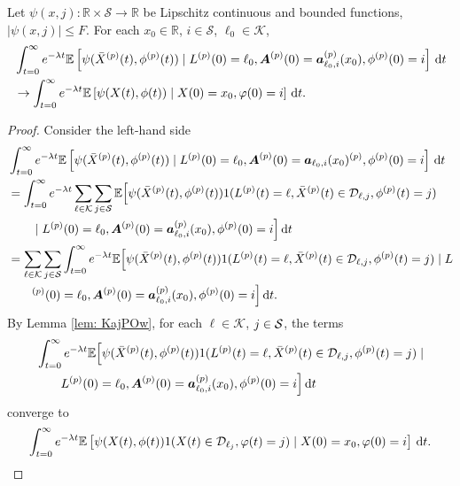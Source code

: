 \begin{cor}\label{cor: lk}
	Let \(\psi(x,j):\mathbb R\times \mathcal S \to \mathbb R\) be Lipschitz continuous and bounded functions, \(|\psi(x,j)|\leq F\). For each \(x_0\in\mathbb R\), \(i\in\mathcal S\), \(\ell_0\in\mathcal K\), 
	\begin{align}
		&\int_{t=0}^\infty e^{-\lambda t}\mathbb E\left[\psi(\bar X^{(p)}(t),\phi^{(p)}(t))  \mid L^{(p)}(0)=\ell_0, \boldsymbol A^{(p)}(0)=\boldsymbol  a_{\ell_0,i}^{(p)}(x_0), \phi^{(p)}(0)=i \right] \, \mathrm{d} t \nonumber
		\\&\to \int_{t=0}^\infty e^{-\lambda t}  \mathbb E\left[\psi(X(t),\phi(t))\mid X(0)=x_0, \varphi(0)=i \right] \, \mathrm{d} t.\nonumber
	\end{align}
\end{cor}
\begin{proof}
	Consider the left-hand side 
	\begin{align}
		&\int_{t=0}^\infty e^{-\lambda t}\mathbb E\left[\psi(\bar X^{(p)}(t),\phi^{(p)}(t))  \mid L^{(p)}(0)=\ell_0, \boldsymbol A^{(p)}(0)=\boldsymbol  a_{\ell_0,i}(x_0)^{(p)}, \phi^{(p)}(0)=i \right] \, \mathrm{d} t \nonumber 
		\\&= \int_{t=0}^\infty e^{-\lambda t}\sum_{\ell\in\mathcal K}\sum_{j\in\mathcal S}\mathbb E\Big[\psi(\bar X^{(p)}(t),\phi^{(p)}(t)) 1(L^{(p)}(t)=\ell, \bar X^{(p)}(t) \in \mathcal D_{\ell,j},\phi^{(p)}(t)=j) \nonumber 
		\\&\qquad{} \mid L^{(p)}(0)=\ell_0,  \boldsymbol A^{(p)}(0)=\boldsymbol  a_{\ell_0,i}^{(p)}(x_0), \phi^{(p)}(0)=i \Big] \, \mathrm{d} t \nonumber 
		\\&= \sum_{\ell\in\mathcal K}\sum_{j\in\mathcal S}\int_{t=0}^\infty e^{-\lambda t}\mathbb E\Big[\psi(\bar X^{(p)}(t),\phi^{(p)}(t)) 1(L^{(p)}(t)=\ell, \bar X^{(p)}(t) \in \mathcal D_{\ell,j},\phi^{(p)}(t)=j)  \mid L\nonumber 
		\\&\qquad{} ^{(p)}(0)=\ell_0, \boldsymbol A^{(p)}(0)=\boldsymbol  a_{\ell_0,i}^{(p)}(x_0), \phi^{(p)}(0)=i \Big] \, \mathrm{d} t. \label{eqnL AKJF cjk ajhJK}
	\end{align}
	By Lemma \ref{lem: KajPOw}, for each \(\ell\in\mathcal K\), \(j\in\mathcal{S}\), the terms 
	 \begin{align}
	 	&\int_{t=0}^\infty e^{-\lambda t}\mathbb E\Big[\psi(\bar X^{(p)}(t),\phi^{(p)}(t)) 1(L^{(p)}(t)=\ell, \bar X^{(p)}(t) \in \mathcal D_{\ell,j},\phi^{(p)}(t)=j)  \mid \nonumber 
		\\&\qquad{}L^{(p)}(0)=\ell_0,  \boldsymbol A^{(p)}(0)=\boldsymbol  a_{\ell_0,i}^{(p)}(x_0), \phi^{(p)}(0)=i \Big] \, \mathrm{d} t
	\end{align}
		converge to 
	\[\int_{t=0}^\infty e^{-\lambda t}  \mathbb E\left[\psi(X(t),\phi(t))1(X(t)\in\mathcal D_{\ell_j},\varphi(t)=j)\mid X(0)=x_0, \varphi(0)=i \right] \, \mathrm{d} t.\]
	

\end{proof}
